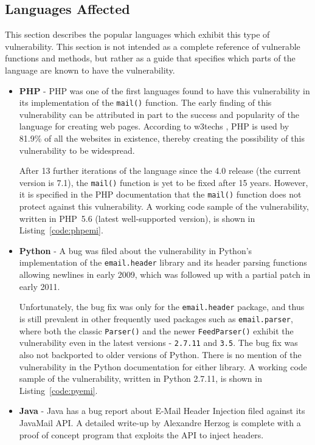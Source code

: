 \subsection{Languages Affected}
\label{languages}
This section describes the popular languages which exhibit this type of vulnerability. This section is not intended as a complete reference of vulnerable functions and methods, but rather as a guide that specifies which parts of the language are known to have the vulnerability.

\begin{itemize}
\item{\textbf{PHP}} - PHP was one of the first languages found to have this vulnerability in its implementation of the \texttt{mail()} function. The early finding of this vulnerability can be attributed in part to the success and popularity of the language for creating web pages. According to w3techs \cite{W3techs}, PHP is used by 81.9\% of all the websites in existence, thereby creating the possibility of this vulnerability to be widespread.

After 13 further iterations of the language since the 4.0 release (the current version is 7.1), the \texttt{mail()} function is yet to be fixed after 15 years. However, it is specified in the PHP documentation \cite{PHPDocs} that the \texttt{mail()} function does not protect against this vulnerability.
A working code sample of the vulnerability, written in PHP~5.6 (latest well-supported version), is shown in  Listing~\ref{code:phpemi}.

\item{\textbf{Python}} -
A bug was filed about the vulnerability in Python's implementation of the \texttt{email.header} library and its header parsing functions allowing newlines in early 2009, which was followed up with a partial patch in early 2011.

Unfortunately, the bug fix was only for the \texttt{email.header} package, and thus is still prevalent in other frequently used packages such as \texttt{email.parser}, where both the classic \texttt{Parser()} and the newer \texttt{FeedParser()} exhibit the vulnerability even in the latest versions - \texttt{2.7.11} and \texttt{3.5}. The bug fix was also not backported to older versions of Python.
There is no mention of the vulnerability in the Python documentation for either library.
A working code sample of the vulnerability, written in Python 2.7.11, is shown in Listing~\ref{code:pyemi}.


\item{\textbf{Java}} -
Java has a bug report about E-Mail Header Injection filed against its JavaMail API. A detailed write-up by Alexandre Herzog \cite{Herzog.2014} is complete with a proof of concept program that exploits the API to inject headers.


\end{itemize}
